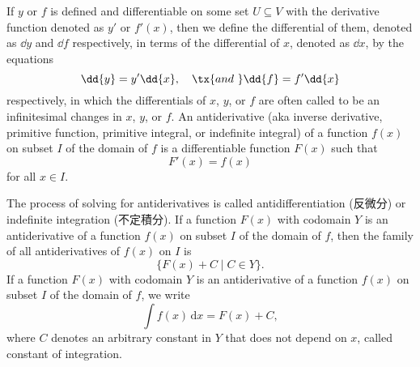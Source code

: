 \documentclass[a4paper,12pt]{report}
\begin{document}
\begin{itemize}
\begin{itemize}
If $y$ or $f$ is defined and differentiable on some set $U\subseteq V$ with the derivative function denoted as $y'$ or $f'(x)$, then we define the differential of them, denoted as $\dd{y}$ and $\dd{f}$ respectively, in terms of the differential of $x$, denoted as $\dd{x}$, by the equations
\[\dd{y}=y'\dd{x},\quad \tx{and\ }\dd{f}=f'\dd{x}\]
respectively, in which the differentials of $x$, $y$, or $f$ are often called to be an infinitesimal changes in $x$, $y$, or $f$.
An antiderivative (aka inverse derivative, primitive function, primitive integral, or indefinite integral) of a function $f(x)$ on subset $I$ of the domain of $f$ is a differentiable function $F(x)$ such that
\[F'(x)=f(x)\]
for all $x\in I$.

The process of solving for antiderivatives is called antidifferentiation (反微分) or indefinite integration (不定積分).
If a function $F(x)$ with codomain $Y$ is an antiderivative of a function $f(x)$ on subset $I$ of the domain of $f$, then the family of all antiderivatives of $f(x)$ on $I$ is
\[\{F(x)+C\mid C\in Y\}.\]
If a function $F(x)$ with codomain $Y$ is an antiderivative of a function $f(x)$ on subset $I$ of the domain of $f$, we write
\[\int f(x)\,\mathrm{d}x=F(x)+C,\]
where $C$ denotes an arbitrary constant in $Y$ that does not depend on $x$, called constant of integration.

\end{itemize}
\end{itemize}
\end{document}
